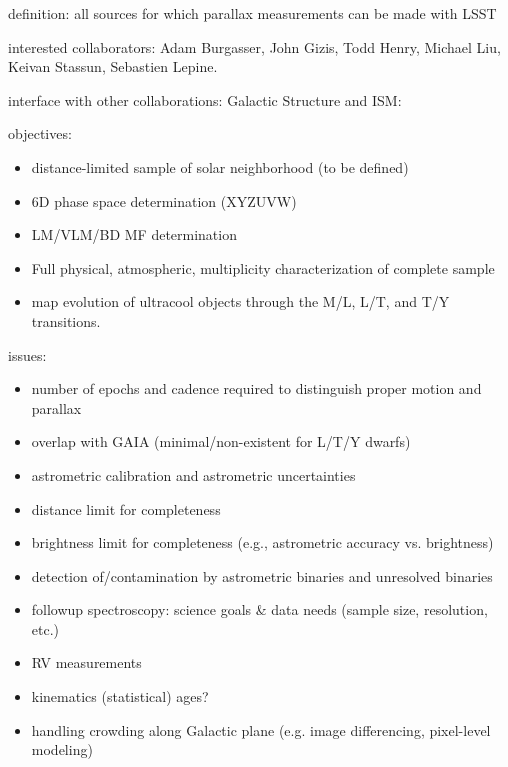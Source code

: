 definition: all sources for which parallax measurements can be made with LSST  

interested collaborators: 
Adam Burgasser,
John Gizis,
Todd 
Henry,
Michael 
Liu,
Keivan 
Stassun,
Sebastien 
Lepine.

interface with other collaborations: 
Galactic Structure and ISM: 

objectives:
\begin{itemize}
\item distance-limited sample of solar neighborhood (to be defined) 
\item 6D phase space determination (XYZUVW) 
\item LM/VLM/BD MF determination 
\item Full physical, atmospheric, multiplicity characterization of complete sample  
\item map evolution of ultracool objects through the M/L, L/T, and T/Y transitions. 
\end{itemize}


issues: 
\begin{itemize}
\item number of epochs and cadence required to distinguish proper motion and parallax 
\item overlap with GAIA (minimal/non-existent for L/T/Y dwarfs) 
\item astrometric calibration and astrometric uncertainties 
\item distance limit for completeness 
\item brightness limit for completeness (e.g., astrometric accuracy vs. brightness) 
\item detection of/contamination by astrometric binaries and unresolved binaries 
\item followup spectroscopy: science goals \& data needs (sample size, resolution, etc.) 
\item RV measurements 
\item kinematics (statistical) ages? 
\item handling crowding along Galactic plane (e.g. image differencing, pixel-level modeling) 
\end{itemize}

